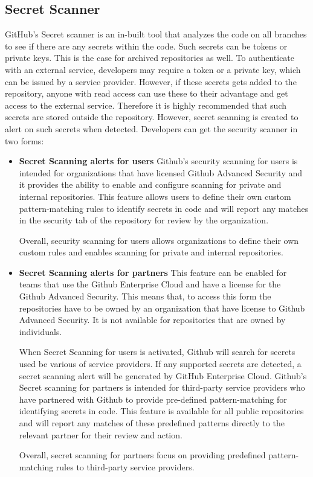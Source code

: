 \subsection{Secret Scanner}
GitHub's Secret scanner is an in-built tool that analyzes the code on all branches to see if there are any secrets within the code. Such secrets can be tokens or private keys. This is the case for archived repositories as well. To authenticate with an external service, developers may require a token or a private key, which can be issued by a service provider. However, if these secrets gets added to the repository, anyone with read access can use these to their advantage and get access to the external service. Therefore it is highly recommended that such secrets are stored outside the repository. However, secret scanning is created to alert on such secrets when detected. Developers can get the
security scanner in two forms: 
\begin{itemize}
    \item \textbf{Secret Scanning alerts for users}
Github's security scanning for users is intended for organizations that have licensed Github Advanced Security and it provides the ability to enable and configure scanning for private and internal repositories. This feature allows users to define their own custom pattern-matching rules to identify secrets in code and will report any matches in the security tab of the repository for review by the organization. 

Overall, security scanning for users allows organizations to define their own custom rules and enables scanning for private and internal repositories.

\item \textbf{Secret Scanning alerts for partners}
This feature can be enabled for teams that use the Github Enterprise Cloud and have a license for the Github Advanced Security. This means that, to access this form the repositories have to be owned by an organization that have license to Github Advanced Security. It is not available for repositories that are owned by individuals. 

When Secret Scanning for users is activated, Github will search for secrets used be various of service providers. If any supported secrets are detected, a secret scanning alert will be generated by GitHub Enterprise Cloud.
Github's Secret scanning for partners is intended for  third-party service providers who have partnered with Github to provide pre-defined pattern-matching for identifying secrets in code. This feature is available for all public repositories and will report any matches of these predefined patterns directly to the relevant partner for their review and action. 

Overall, secret scanning for partners focus on providing predefined pattern-matching rules to third-party service providers. 
\cite{GithubSecretScanning}
\end{itemize}

